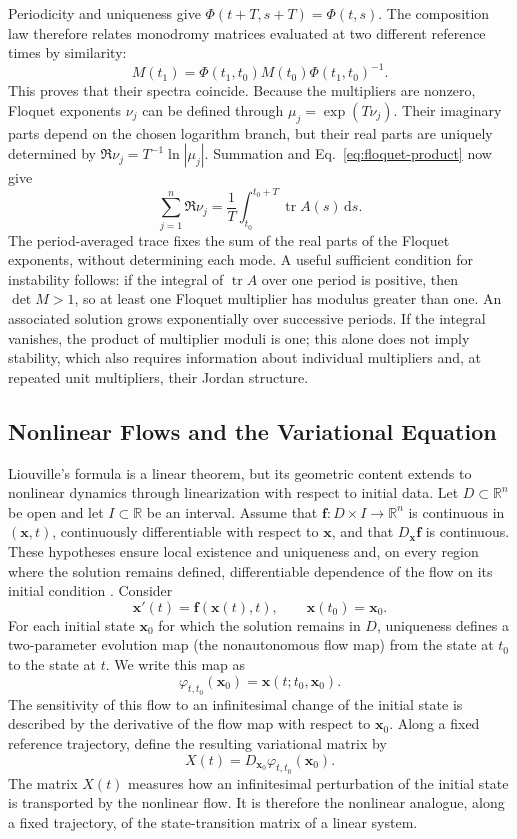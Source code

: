\documentclass[11pt,a4paper]{article}
\newcommand{\be}{\begin{equation}}
\newcommand{\ee}{\end{equation}}
\newcommand{\lb}[1]{\label{#1}}
\newcommand{\dd}{\mathrm{d}}
\newcommand{\R}{\mathbb{R}}
\DeclareMathOperator{\tr}{tr}
\theoremstyle{definition}
\numberwithin{equation}{section}
\begin{document}
Periodicity and uniqueness give $\Phi(t+T,s+T)=\Phi(t,s)$. The composition law therefore relates monodromy matrices evaluated at two different reference times by similarity:
\be
M(t_1)=\Phi(t_1,t_0)M(t_0)\Phi(t_1,t_0)^{-1}.
\lb{eq:floquet-monodromy-similarity}
\ee
This proves that their spectra coincide. Because the multipliers are nonzero, Floquet exponents $\nu_j$ can be defined through $\mu_j=\exp(T\nu_j)$. Their imaginary parts depend on the chosen logarithm branch, but their real parts are uniquely determined by $\Re\nu_j=T^{-1}\ln|\mu_j|$. Summation and Eq.~\eqref{eq:floquet-product} now give
\be
\sum_{j=1}^{n}\Re\nu_j
=
\frac{1}{T}
\int_{t_0}^{t_0+T}\tr A(s)\,\dd s.
\lb{eq:floquet-exponent-sum}
\ee
The period-averaged trace fixes the sum of the real parts of the Floquet exponents, without determining each mode. A useful sufficient condition for instability follows: if the integral of $\tr A$ over one period is positive, then $\det M>1$, so at least one Floquet multiplier has modulus greater than one. An associated solution grows exponentially over successive periods. If the integral vanishes, the product of multiplier moduli is one; this alone does not imply stability, which also requires information about individual multipliers and, at repeated unit multipliers, their Jordan structure.

\subsection{Nonlinear Flows and the Variational Equation}

Liouville's formula is a linear theorem, but its geometric content extends to nonlinear dynamics through linearization with respect to initial data. Let $D\subset\R^n$ be open and let $I\subset\R$ be an interval. Assume that $\mathbf f:D\times I\to\R^n$ is continuous in $(\mathbf x,t)$, continuously differentiable with respect to $\mathbf x$, and that $D_{\mathbf x}\mathbf f$ is continuous. These hypotheses ensure local existence and uniqueness and, on every region where the solution remains defined, differentiable dependence of the flow on its initial condition \cite{hartman2002,hirsch2013,perko2001}. Consider
\be
\mathbf{x}'(t)=\mathbf f(\mathbf x(t),t),
\qquad
\mathbf x(t_0)=\mathbf x_0.
\lb{eq:nonlinear-flow}
\ee
For each initial state $\mathbf x_0$ for which the solution remains in $D$, uniqueness defines a two-parameter evolution map (the nonautonomous flow map) from the state at $t_0$ to the state at $t$. We write this map as
\be
\varphi_{t,t_0}(\mathbf x_0)=\mathbf x(t;t_0,\mathbf x_0).
\lb{eq:nonlinear-flow-map}
\ee
The sensitivity of this flow to an infinitesimal change of the initial state is described by the derivative of the flow map with respect to $\mathbf x_0$. Along a fixed reference trajectory, define the resulting variational matrix by
\be
X(t)=D_{\mathbf x_0}\varphi_{t,t_0}(\mathbf x_0).
\lb{eq:variational-matrix}
\ee
The matrix $X(t)$ measures how an infinitesimal perturbation of the initial state is transported by the nonlinear flow. It is therefore the nonlinear analogue, along a fixed trajectory, of the state-transition matrix of a linear system.
\end{document}
